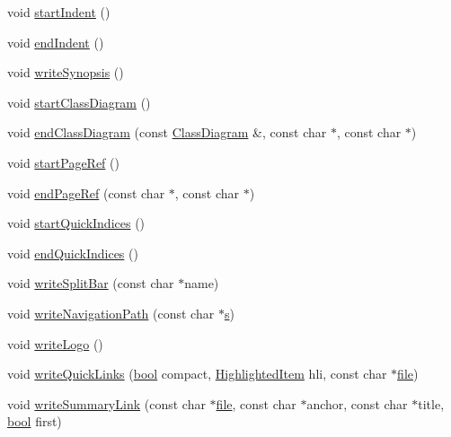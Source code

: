 \begin{DoxyCompactItemize}
void \hyperlink{class_html_generator_aafe5fc8d00e32357b60fd4e0b0c8e0e7}{start\+Indent} ()
\item 
void \hyperlink{class_html_generator_ac8a600145a8b33e3dc984a0cb834d859}{end\+Indent} ()
\item 
void \hyperlink{class_html_generator_a80d44096489c83020c550122705afd66}{write\+Synopsis} ()
\item 
void \hyperlink{class_html_generator_a1c8b9863208e217cf6642951ef006498}{start\+Class\+Diagram} ()
\item 
void \hyperlink{class_html_generator_a3884a61305d09d1ecbddfb0bc0fe2733}{end\+Class\+Diagram} (const \hyperlink{class_class_diagram}{Class\+Diagram} \&, const char $\ast$, const char $\ast$)
\item 
void \hyperlink{class_html_generator_a815ab026ba09dceca7ad84157e9eb4dc}{start\+Page\+Ref} ()
\item 
void \hyperlink{class_html_generator_a0d8ff1d418517388be08b4cb8f63ef6e}{end\+Page\+Ref} (const char $\ast$, const char $\ast$)
\item 
void \hyperlink{class_html_generator_ac19bda7a07fbdf7069a7601e97dc2276}{start\+Quick\+Indices} ()
\item 
void \hyperlink{class_html_generator_a72052df688b371d1b3fe83ec95273e78}{end\+Quick\+Indices} ()
\item 
void \hyperlink{class_html_generator_a9856409be5e34cb9f7461e9c6076b8e9}{write\+Split\+Bar} (const char $\ast$name)
\item 
void \hyperlink{class_html_generator_aea25a87c7877cf9a4bb04c4e63debacf}{write\+Navigation\+Path} (const char $\ast$\hyperlink{060__command__switch_8tcl_a011c73f2dbb87635a3b4206c72355f6e}{s})
\item 
void \hyperlink{class_html_generator_a6f2d8ea4be1a4586c32c8217d7716422}{write\+Logo} ()
\item 
void \hyperlink{class_html_generator_aa4c36c4fe46af1be803d39f7b1d95a41}{write\+Quick\+Links} (\hyperlink{qglobal_8h_a1062901a7428fdd9c7f180f5e01ea056}{bool} compact, \hyperlink{index_8h_a6643b7765422a7eb577f0b2ed8fb2e09}{Highlighted\+Item} hli, const char $\ast$\hyperlink{class_output_generator_aed5ad11c3844cdf71ec6fee6c1c84286}{file})
\item 
void \hyperlink{class_html_generator_aea30e4c7f7f5ff602bdbee818d1f06cc}{write\+Summary\+Link} (const char $\ast$\hyperlink{class_output_generator_aed5ad11c3844cdf71ec6fee6c1c84286}{file}, const char $\ast$anchor, const char $\ast$title, \hyperlink{qglobal_8h_a1062901a7428fdd9c7f180f5e01ea056}{bool} first)

\end{DoxyCompactItemize}
